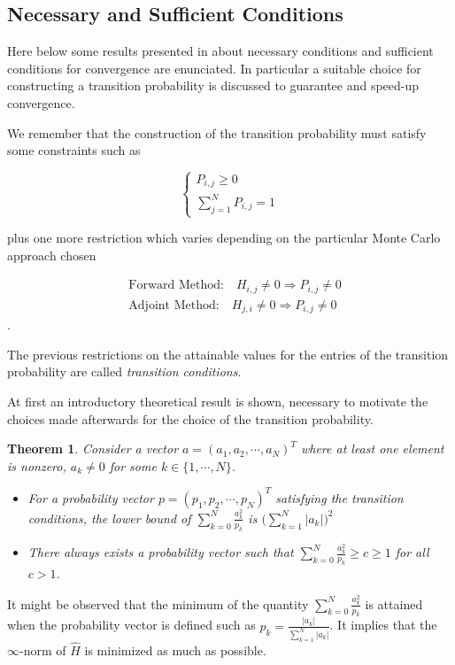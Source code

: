 \documentclass[a4paper,10pt]{article}
\newtheorem{thm}{Theorem}
\begin{document}
\subsection{Necessary and Sufficient Conditions}

Here below some results presented in
\cite{MASC2013} about necessary conditions and sufficient
conditions for
convergence are enunciated. In particular a suitable choice for constructing a
transition probability is discussed to guarantee and speed-up convergence.

We remember that the construction of the transition probability must satisfy
some constraints such as

\[
\begin{cases}
  P_{i,j}\ge 0 \\
 \sum_{j=1}^N P_{i,j}=1
\end{cases}
\]

plus one more restriction which varies depending on the particular Monte Carlo
approach chosen

\begin{align*}
& \text{Forward Method:} \quad H_{i,j}\ne 0 \Rightarrow P_{i,j}\ne 0 \\ &
\text{Adjoint Method:} \quad H_{j,i}\ne 0 \Rightarrow P_{i,j}\ne 0
\end{align*}.

The previous restrictions on the attainable values for the entries of the
transition probability are called \textit{transition conditions}.


At first an introductory theoretical result is shown, necessary to motivate the
choices made afterwards for the choice of the transition probability.

\begin{thm}
 Consider a vector $a=(a_1,a_2,\cdots,a_N)^T$ where at least one element is
nonzero, $a_k\ne0$ for some $k\in\{1,\cdots,N\}$.
\begin{itemize}
 \item For a probability vector $p=(p_1,p_2,\cdots,p_N)^T$ satisfying the
transition conditions, the lower bound of $\displaystyle
\sum_{k=0}^N\frac{a_k^2}{p_k}$ is $\bigg(\sum_{k=1}^N \lvert a_k\rvert\bigg)^2$
\item There always exists a probability vector such that $\displaystyle
\sum_{k=0}^N\frac{a_k^2}{p_k}\ge c\ge 1$ for all $c>1$.
\end{itemize}
\label{lemma}
\end{thm}

It might be observed that the minimum of the quantity $\displaystyle
\sum_{k=0}^N\frac{a_k^2}{p_k}$ is attained when the probability vector is
defined such as $\displaystyle p_k=\frac{\lvert a_k\rvert}{\sum_{k=1}^N \lvert
a_k\rvert}$. It implies that the $\infty$-norm of $\hat{H}$ is minimized as
much
as possible. \newline
\end{document}

